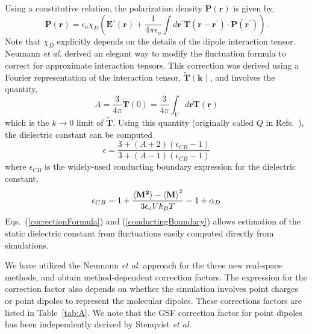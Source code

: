 Using a constitutive relation, the polarization density
$\mathbf{P}(\mathbf{r})$ is given by,
\begin{equation}
\mathbf{P}(\mathbf{r}) = \epsilon_o \chi_D
\left(\mathbf{E}^\circ(\mathbf{r}) + \frac{1}{4\pi\epsilon_o} \int
  d\mathbf{r}^\prime \mathbf{T}(\mathbf{r}-\mathbf{r}^\prime ) \cdot \mathbf{P}(\mathbf{r}^\prime)\right).
\label{constDipole}
\end{equation}
Note that $\chi_D$ explicitly depends on the details of the dipole
interaction tensor.  Neumann \textit{et al.}
\cite{NeumannI83,NeumannII83,Neumann84,Neumann85} derived an elegant
way to modify the fluctuation formula to correct for approximate
interaction tensors. This correction was derived using a Fourier
representation of the interaction tensor,
$\tilde{\mathbf{T}}(\mathbf{k})$, and involves the quantity,
\begin{equation}
 A = \frac{3}{4\pi}\tilde{\mathbf{T}}(0) = \frac{3}{4\pi} \int_V
 d\mathbf{r} \mathbf{T}(\mathbf{r})
 \label{dipCorrFactor}
\end{equation}
which is the $k \rightarrow 0$ limit of $\tilde{\mathbf{T}}$.  Using
this quantity (originally called $Q$ in
Refs.~\cite{NeumannI83,NeumannII83,Neumann84,Neumann85}), the
dielectric constant can be computed
\begin{equation}
\epsilon = \frac{3+(A + 2)(\epsilon_{CB}-1)}{3 + (A -1)(\epsilon_{CB}-1)}
\label{correctionFormula}
\end{equation}
where $\epsilon_{CB}$ is the widely-used conducting boundary
expression for the dielectric constant,
\begin{equation}
\epsilon_{CB} = 1 + \frac{\braket{\bf{M}^2}-{\braket{\bf{M}}}^2}{3
  \epsilon_o V k_B T} = 1 + \alpha_{D}
\label{conductingBoundary}
\end{equation}
Eqs.~(\ref{correctionFormula}) and (\ref{conductingBoundary}) allows
estimation of the static dielectric constant from fluctuations easily
computed directly from simulations.

We have utilized the Neumann \textit{et al.} approach for the three
new real-space methods, and obtain method-dependent correction
factors.  The expression for the correction factor also depends on
whether the simulation involves point charges or point dipoles to
represent the molecular dipoles.  These corrections factors are 
listed in Table~\ref{tab:A}. We note that the GSF correction factor for
point dipoles has been independently derived by Stenqvist \textit{et
  al.}\cite{Stenqvist:2015ph}

